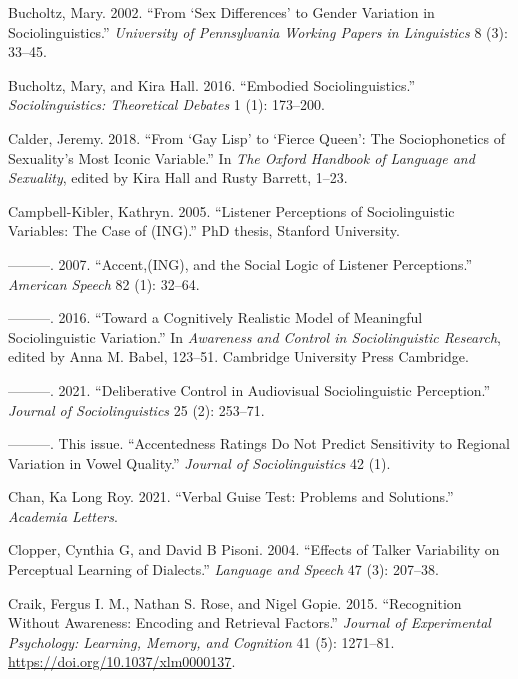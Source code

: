 \documentclass[
  letterpaper,
  DIV=11,
  numbers=noendperiod]{scrartcl}
\newlength{\cslhangindent}
\newenvironment{CSLReferences}[2] %
 {\begin{list}{}{%
  \setlength{\itemindent}{0pt}
  \setlength{\leftmargin}{0pt}
  \setlength{\parsep}{0pt}
  \ifodd #1
   \setlength{\leftmargin}{\cslhangindent}
   \setlength{\itemindent}{-1\cslhangindent}
  \fi
  \setlength{\itemsep}{#2\baselineskip}}}
 {\end{list}}
\begin{document}
\begin{CSLReferences}{1}{0}
Bucholtz, Mary. 2002. {``From {`Sex Differences'} to Gender Variation in
Sociolinguistics.''} \emph{University of Pennsylvania Working Papers in
Linguistics} 8 (3): 33--45.

Bucholtz, Mary, and Kira Hall. 2016. {``Embodied Sociolinguistics.''}
\emph{Sociolinguistics: Theoretical Debates} 1 (1): 173--200.

Calder, Jeremy. 2018. {``From {`Gay Lisp'} to {`Fierce Queen'}: The
Sociophonetics of Sexuality's Most Iconic Variable.''} In \emph{The
Oxford Handbook of Language and Sexuality}, edited by Kira Hall and
Rusty Barrett, 1--23.

Campbell-Kibler, Kathryn. 2005. {``Listener Perceptions of
Sociolinguistic Variables: The Case of (ING).''} PhD thesis, Stanford
University.

---------. 2007. {``Accent,(ING), and the Social Logic of Listener
Perceptions.''} \emph{American Speech} 82 (1): 32--64.

---------. 2016. {``Toward a Cognitively Realistic Model of Meaningful
Sociolinguistic Variation.''} In \emph{Awareness and Control in
Sociolinguistic Research}, edited by Anna M. Babel, 123--51. Cambridge
University Press Cambridge.

---------. 2021. {``Deliberative Control in Audiovisual Sociolinguistic
Perception.''} \emph{Journal of Sociolinguistics} 25 (2): 253--71.

---------. This issue. {``Accentedness Ratings Do Not Predict
Sensitivity to Regional Variation in Vowel Quality.''} \emph{Journal of
Sociolinguistics} 42 (1).

Chan, Ka Long Roy. 2021. {``Verbal Guise Test: Problems and
Solutions.''} \emph{Academia Letters}.

Clopper, Cynthia G, and David B Pisoni. 2004. {``Effects of Talker
Variability on Perceptual Learning of Dialects.''} \emph{Language and
Speech} 47 (3): 207--38.

Craik, Fergus I. M., Nathan S. Rose, and Nigel Gopie. 2015.
{``Recognition Without Awareness: {Encoding} and Retrieval Factors.''}
\emph{Journal of Experimental Psychology: Learning, Memory, and
Cognition} 41 (5): 1271--81. \url{https://doi.org/10.1037/xlm0000137}.


\end{CSLReferences}
\end{document}
